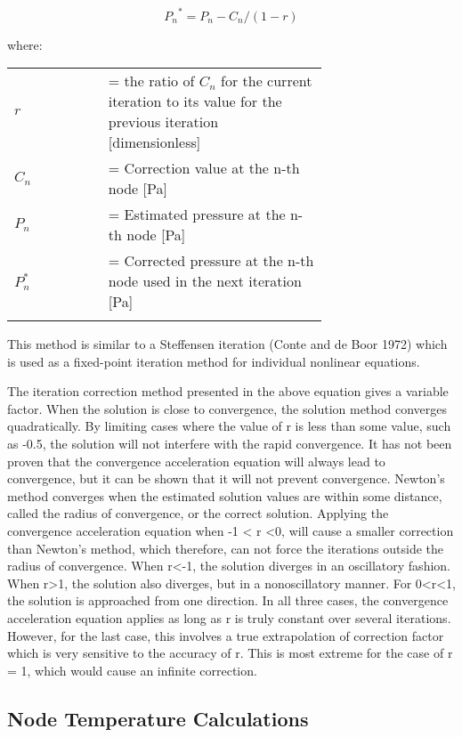 \begin{equation}
{P_n}^* = P_n - C_n/(1 - r)
\end{equation}

where:

\begin{tabular}{lp{0.7\linewidth}}
\\
$r$ &= the ratio of $C_n$ for the current iteration to its value for the previous iteration [dimensionless]\\
$C_n$ &= Correction value at the n-th node [Pa]\\
$P_n$ &= Estimated pressure at the n-th node [Pa]\\
$P_n^*$ &= Corrected pressure at the n-th node used in the next iteration [Pa]\\
\\
\end{tabular}

This method is similar to a Steffensen iteration (Conte and de Boor 1972) which is used as a fixed-point iteration method for individual nonlinear equations.

The iteration correction method presented in the above equation gives a variable factor. When the solution is close to convergence, the solution method converges quadratically. By limiting cases where the value of r is less than some value, such as -0.5, the solution will not interfere with the rapid convergence. It has not been proven that the convergence acceleration equation will always lead to convergence, but it can be shown that it will not prevent convergence. Newton's method converges when the estimated solution values are within some distance, called the radius of convergence, or the correct solution. Applying the convergence acceleration equation when -1 \textless{} r \textless{}0, will cause a smaller correction than Newton's method, which therefore, can not force the iterations outside the radius of convergence. When r\textless{}-1, the solution diverges in an oscillatory fashion. When r\textgreater{}1, the solution also diverges, but in a nonoscillatory manner. For 0\textless{}r\textless{}1, the solution is approached from one direction. In all three cases, the convergence acceleration equation applies as long as r is truly constant over several iterations. However, for the last case, this involves a true extrapolation of correction factor which is very sensitive to the accuracy of r. This is most extreme for the case of r = 1, which would cause an infinite correction.

\subsection{Node Temperature Calculations}\label{node-temperature-calculations}

